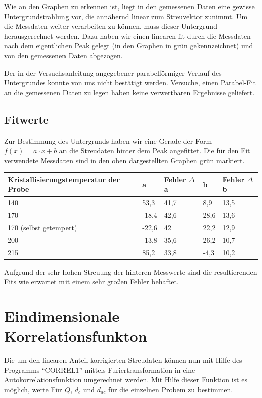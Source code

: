 \documentclass[bigchapter,colorback,accentcolor=tud4b,linedtoc,11pt]{tudreport}
\begin{document}
\FloatBarrier

Wie an den Graphen zu erkennen ist, liegt in den gemessenen Daten eine gewisse Untergrundstrahlung vor, die annähernd linear zum Streuvektor zunimmt. Um die Messdaten weiter verarbeiten zu können, muss dieser Untergrund herausgerechnet werden. Dazu haben wir einen linearen fit durch die Messdaten nach dem eigentlichen Peak gelegt (in den Graphen in grün gekennzeichnet) und von den gemessenen Daten abgezogen.

Der in der Versuchsanleitung angegebener parabelförmiger Verlauf des Untergrundes konnte von uns nicht bestätigt werden. Versuche, einen Parabel-Fit an die gemessenen Daten zu legen haben keine verwertbaren Ergebnisse geliefert.

\subsection{Fitwerte}
Zur Bestimmung des Untergrunds haben wir eine Gerade der Form $f(x) = a \cdot x + b$ an die Streudaten hinter dem Peak angefittet. Die für den Fit verwendete Messdaten sind in den oben dargestellten Graphen grün markiert.

\begin{center}
  \begin{tabular}{|p{7cm}|p{2.2cm}|p{2.2cm}|p{2.2cm}|p{2.2cm}|}
    \hline
    Kristallisierungstemperatur der Probe & a        & Fehler $\Delta$a & b & Fehler $\Delta$b  \\ \hline
    140                                   & 53,3     & 41,7        & 8,9      & 13,5    \\ \hline
    170                                   & -18,4    & 42,6        & 28,6     & 13,6    \\ \hline
    170 (selbst getempert)                & -22,6    & 42          & 22,2     & 12,9    \\ \hline
    200                                   & -13,8    & 35,6        & 26,2     & 10,7    \\ \hline
    215                                   & 85,2     & 33,8        & -4,3     & 10,2    \\ \hline
	\end{tabular}
\end{center}

Aufgrund der sehr hohen Streuung der hinteren Messwerte sind die resultierenden Fits wie erwartet mit einem sehr großen Fehler behaftet.


\section{Eindimensionale Korrelationsfunkton}
Die um den linearen Anteil korrigierten Streudaten können nun mit Hilfe des Programms "`CORREL1"' mittels Furiertransformation in eine Autokorrelationsfunktion umgerechnet werden. Mit Hilfe dieser Funktion ist es möglich, werte Für $Q$, $d_c$ und $d_{ac}$ für die einzelnen Probem zu bestimmen.
\end{document}
